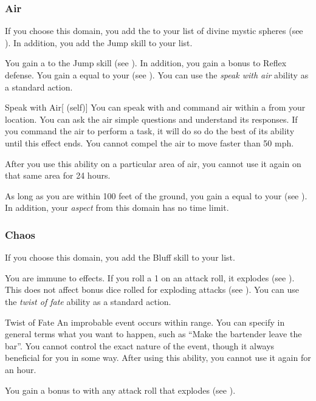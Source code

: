         \subsubsection{Air}
            If you choose this domain, you add the   to your list of divine mystic spheres (see ).
            In addition, you add the Jump skill to your  list.

             You gain a   to the Jump skill (see ).
            In addition, you gain a  bonus to Reflex defense.
             You gain a  equal to your  (see ).
             You can use the \textit{speak with air} ability as a standard action.
            \begin{attuneability}{Speak with Air}[ (self)]
                You can speak with and command air within a \areahuge {} from your location.
                You can ask the air simple questions and understand its responses.
                If you command the air to perform a task, it will do so do the best of its ability until this effect ends.
                You cannot compel the air to move faster than 50 mph.

                After you use this ability on a particular area of air, you cannot use it again on that same area for 24 hours.
            \end{attuneability}
             As long as you are within 100 feet of the ground, you gain a  equal to your  (see ).
            In addition, your \textit{aspect} from this domain has no time limit.

        \subsubsection{Chaos}
            If you choose this domain, you add the Bluff skill to your  list.

             You are immune to  effects.
             If you roll a 1 on an attack roll, it explodes (see ).
            This does not affect bonus dice rolled for exploding attacks (see ).
             You can use the \textit{twist of fate} ability as a standard action.
            \begin{freeability}{Twist of Fate}
                An improbable event occurs within \rnglong range.
                You can specify in general terms what you want to happen, such as ``Make the bartender leave the bar''.
                You cannot control the exact nature of the event, though it always beneficial for you in some way.
                After using this ability, you cannot use it again for an hour.
            \end{freeability}
             You gain a  bonus to  with any attack roll that explodes (see ).

